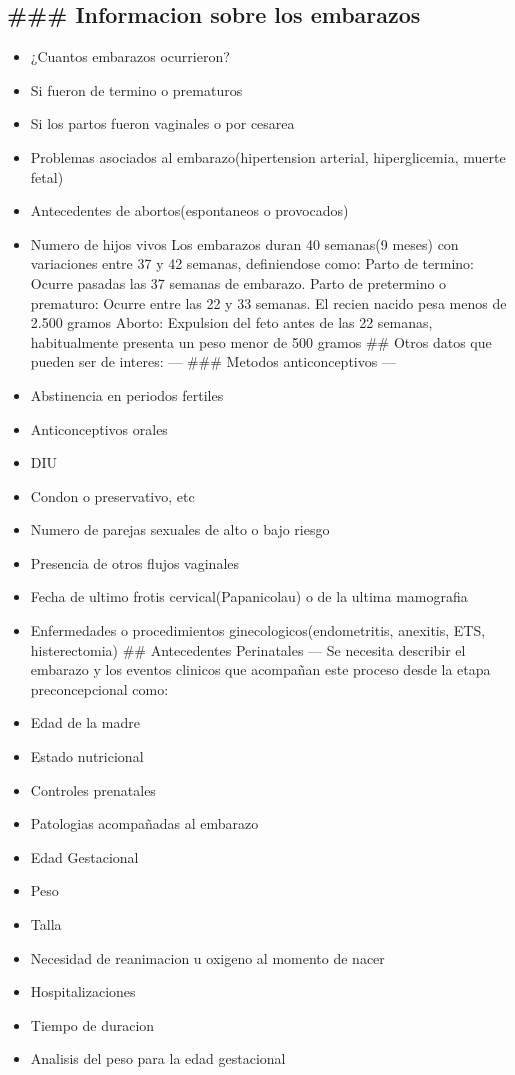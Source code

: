 \documentclass[
]{article}
\providecommand{\tightlist}{%
  \setlength{\itemsep}{0pt}\setlength{\parskip}{0pt}}
\begin{document}
\hypertarget{informacion-sobre-los-embarazos}{%
\subsection{\#\#\# Informacion sobre los
embarazos}\label{informacion-sobre-los-embarazos}}

\begin{itemize}
\tightlist
\item
  ¿Cuantos embarazos ocurrieron?
\item
  Si fueron de termino o prematuros
\item
  Si los partos fueron vaginales o por cesarea
\item
  Problemas asociados al embarazo(hipertension arterial, hiperglicemia,
  muerte fetal)
\item
  Antecedentes de abortos(espontaneos o provocados)
\item
  Numero de hijos vivos Los embarazos duran 40 semanas(9 meses) con
  variaciones entre 37 y 42 semanas, definiendose como: Parto de
  termino: Ocurre pasadas las 37 semanas de embarazo. Parto de
  pretermino o prematuro: Ocurre entre las 22 y 33 semanas. El recien
  nacido pesa menos de 2.500 gramos Aborto: Expulsion del feto antes de
  las 22 semanas, habitualmente presenta un peso menor de 500 gramos
  \#\# Otros datos que pueden ser de interes: --- \#\#\# Metodos
  anticonceptivos ---
\item
  Abstinencia en periodos fertiles
\item
  Anticonceptivos orales
\item
  DIU
\item
  Condon o preservativo, etc
\item
  Numero de parejas sexuales de alto o bajo riesgo
\item
  Presencia de otros flujos vaginales
\item
  Fecha de ultimo frotis cervical(Papanicolau) o de la ultima mamografia
\item
  Enfermedades o procedimientos ginecologicos(endometritis, anexitis,
  ETS, histerectomia) \#\# Antecedentes Perinatales --- Se necesita
  describir el embarazo y los eventos clinicos que acompañan este
  proceso desde la etapa preconcepcional como:
\item
  Edad de la madre
\item
  Estado nutricional
\item
  Controles prenatales
\item
  Patologias acompañadas al embarazo
\item
  Edad Gestacional
\item
  Peso
\item
  Talla
\item
  Necesidad de reanimacion u oxigeno al momento de nacer
\item
  Hospitalizaciones
\item
  Tiempo de duracion
\item
  Analisis del peso para la edad gestacional
\end{itemize}
\end{document}
